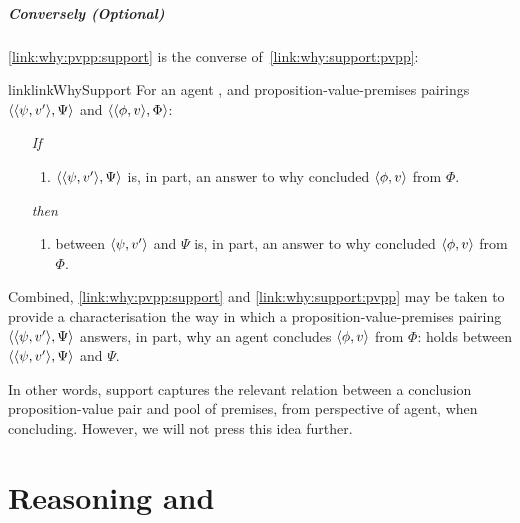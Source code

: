 \subparagraph[Conversely]{Conversely \hfill (Optional)}

\begin{noteP}
  \autoref{link:why:pvpp:support} is the converse of~\autoref{link:why:support:pvpp}:

  \begin{restatable}[]{link}{linkWhySupport}
    \label{link:why:pvpp:support}
    For an agent \vAgent{}, and proposition-value-premises pairings \(\langle \langle \psi, v' \rangle, \Psi \rangle\) and \(\langle \langle \phi, v \rangle, \Phi \rangle\):
    \begin{itemize}
    \item[\emph{If}]
      \begin{enumerate}[label=\alph*., ref=(\alph*)]
      \item
        \(\langle \langle \psi, v' \rangle, \Psi \rangle\) is, in part, an answer to why \vAgent{} concluded \(\langle \phi, v \rangle\) from \(\Phi\).
      \end{enumerate}
    \item[\emph{then}]
      \begin{enumerate}[label=\alph*., ref=(\alph*), resume]
      \item
         between \(\langle \psi, v' \rangle\) and \(\Psi\) is, in part, an answer to why \vAgent{} concluded \(\langle \phi, v \rangle\) from \(\Phi\).
      \end{enumerate}
    \end{itemize}
    \vspace{-\baselineskip}
  \end{restatable}

  Combined, \autoref{link:why:pvpp:support} and \autoref{link:why:support:pvpp} may be taken to provide a characterisation the way in which a proposition-value-premises pairing \(\langle \langle \psi, v' \rangle, \Psi \rangle\) answers, in part, why an agent concludes \(\langle \phi, v \rangle\) from \(\Phi\):
   holds between \(\langle \langle \psi, v' \rangle, \Psi \rangle\) and \(\Psi\).

  In other words, support captures the relevant relation between a conclusion proposition-value pair and pool of premises, from perspective of agent, when concluding.
  However, we will not press this idea further.
\end{noteP}

\section{Reasoning and \qHow{}}
\label{sec:overview:reasoning}
\label{cha:clar:expand:qHow}

